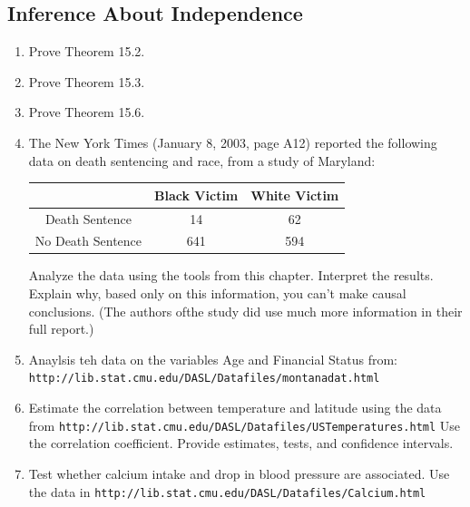 \documentclass{article}
\begin{document}
\subsection{Inference About Independence}
\begin{enumerate}
	\item Prove Theorem 15.2.
	\item Prove Theorem 15.3.
	\item Prove Theorem 15.6.
	\item The New York Times (January 8, 2003, page A12) reported the following data on death sentencing and race, from a study of Maryland:
	\begin{center}
		\begin{tabular}{|c|c|c|}
			\hline
			& Black Victim & White Victim \\
			\hline
			Death Sentence & 14 & 62 \\
			\hline
			No Death Sentence & 641 & 594 \\
			\hline
		\end{tabular}
	\end{center}
	Analyze the data using the tools from this chapter. Interpret the results. Explain why, based only on this information, you can't make causal conclusions. (The authors ofthe study did use much more information in their full report.)
	\item Anaylsis teh data on the variables Age and Financial Status from:
	\texttt{http://lib.stat.cmu.edu/DASL/Datafiles/montanadat.html}
	\item Estimate the correlation between temperature and latitude using the data from
	\texttt{http://lib.stat.cmu.edu/DASL/Datafiles/USTemperatures.html}
	Use the correlation coefficient. Provide estimates, tests, and confidence intervals.
	\item Test whether calcium intake and drop in blood pressure are associated. Use the data in
	\texttt{http://lib.stat.cmu.edu/DASL/Datafiles/Calcium.html}
\end{enumerate}
\end{document}
